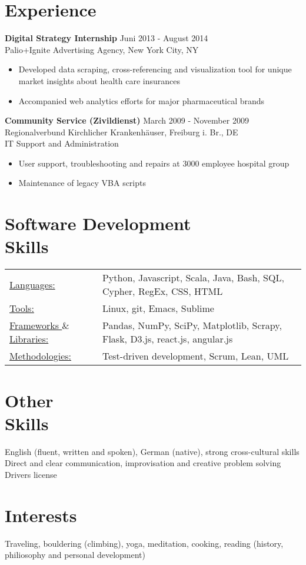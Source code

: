 \documentclass[margin]{res}
\begin{document}
\begin{resume}
\section{Experience} 
{\bf Digital Strategy Internship} \hfill Juni 2013 - August 2014\\
Palio+Ignite Advertising Agency, New York City, NY
\begin{itemize} \itemsep -2pt  %
\item Developed data scraping, cross-referencing and visualization tool for unique market insights about health care insurances
\item Accompanied web analytics efforts for major pharmaceutical brands
 \end{itemize}

{\bf Community Service (Zivildienst)} \hfill March 2009 - November 2009\\
Regionalverbund Kirchlicher Krankenh{\"a}user, Freiburg i. Br., DE \\
IT Support and Administration
\begin{itemize} \itemsep -2pt  %
\item User support, troubleshooting and repairs at 3000 employee hospital group
\item Maintenance of legacy VBA scripts
\end{itemize}



\section{Software Development \\ Skills}
   \begin{tabular}{l p{3in}}
    \underline{Languages:} & Python, Javascript, Scala, Java, Bash, SQL, Cypher, RegEx, CSS, HTML \\
    \underline{Tools:} &  Linux, git, Emacs, Sublime \\
    \underline{Frameworks $\&$ Libraries:} & Pandas, NumPy, SciPy, Matplotlib, Scrapy, Flask, D3.js, react.js, angular.js \\
    \underline{Methodologies:} & Test-driven development, Scrum, Lean, UML \\
 \end{tabular}

\section{Other \\ Skills}
  English (fluent, written and spoken), German (native), strong cross-cultural skills \\
  Direct and clear communication, improvisation and creative problem solving \\
  Drivers license

\section{Interests}
     Traveling, bouldering (climbing), yoga, meditation, cooking, reading (history, philiosophy and personal development)


\end{resume} 
\end{document}
